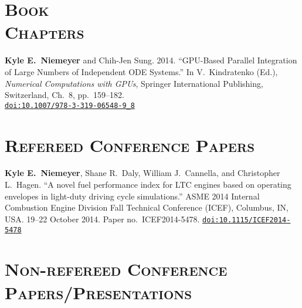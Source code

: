 \documentclass[margin,line,11pt]{res}
\makeatletter
\newlength{\bibhang}
\newlength{\bibsep}
 {\@listi \global\bibsep\itemsep \global\advance\bibsep by\parsep}
\newenvironment{bibenum*}
  {\renewcommand\labelenumi{\theenumi.}%
   \etaremune[
     topsep=0pt,
     itemsep=\bibsep,
     parsep=0pt,partopsep=0pt,
     itemindent=-\bibhang,
     leftmargin={\bibhang+\widthof{[999]}}]}
  {\endetaremune}
\newcommand*{\doi}[1]{\href{http://dx.doi.org/#1}{\nolinkurl{doi:#1}}}
\makeatother
\begin{document}
\begin{resume}
\section{\textsc{Book\\Chapters}}

\begin{bibenum*}

\item \textbf{Kyle E.\ Niemeyer} and Chih-Jen Sung.
2014.
``GPU-Based Parallel Integration of Large Numbers of Independent ODE Systems.''
In V.\ Kindratenko (Ed.), \emph{Numerical Computations with GPUs}, Springer International Publishing, Switzerland, Ch.\ 8, pp.\ 159--182. \\
\doi{10.1007/978-3-319-06548-9_8}

\end{bibenum*}

\section{\textsc{Refereed Conference Papers}}

\begin{bibenum*}

\item \textbf{Kyle E.\ Niemeyer}, Shane R.\ Daly, William J.\ Cannella, and Christopher L.\ Hagen.
``A novel fuel performance index for LTC engines based on operating envelopes in light-duty driving cycle simulations.''
ASME 2014 Internal Combustion Engine Division Fall Technical Conference (ICEF), Columbus, IN, USA.
19--22 October 2014.
Paper no.~ICEF2014-5478.
\doi{10.1115/ICEF2014-5478}

\end{bibenum*}

\section{\textsc{Non-refereed Conference Papers\slash Presentations}}

\begin{bibenum*}


\end{bibenum*}
\end{resume}
\end{document}
